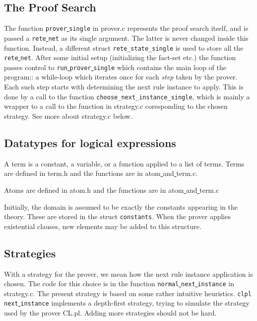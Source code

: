 \documentclass[a4paper]{article}
\begin{document}
\subsection{The Proof Search}
The function \verb|prover|\underline{ }\verb|single| in prover.c represents the proof search itself, and is passed a \verb|rete|\underline{ }\verb|net| as its single argument. The latter is never changed inside this function. Instead, a different struct \verb|rete_state_single| is used to store all the \verb|rete|\underline{ }\verb|net|. After some initial setup (initializing the fact-set etc.) the function passes control to  \verb|run|\underline{ }\verb|prover|\underline{ }\verb|single| which contains the main loop of the program;: a while-loop which iterates once for each \emph{step} taken by the prover. Each such step starts with determining the next rule instance to apply. This is done by a call to the function \verb|choose_next_instance_single|, which is mainly a wrapper to a call to the function in strategy.c coresponding to the chosen strategy. See more about strategy.c below.

\subsection{Datatypes for logical expressions}
A term is a constant, a variable, or a function applied to a list of terms. Terms are defined in term.h and the functions are in atom\underline{ }and\underline{ }term.c. 

Atoms are defined in atom.h and the functions are in atom\underline{ }and\underline{ }term.c

Initially, the domain is assumed to be exactly the constants appearing in the theory. These are stored in the struct \verb|constants|. When the prover applies existential clauses, new elements may be added to this structure. 

\subsection{Strategies}
With a strategy for the prover, we mean how the next rule instance application is chosen. The code for this choice is in the function \verb|normal|\underline{ }\verb|next|\underline{ }\verb|instance| in strategy.c. The present strategy is based on some rather intuitive heuristics. \verb|clpl|\underline{ }\verb|next|\underline{ }\verb|instance| implements a depth-first strategy, trying to simulate the strategy used by the prover CL.pl. Adding more strategies should not be hard.
\end{document}
